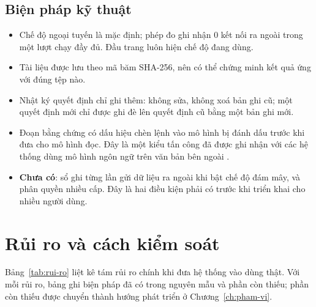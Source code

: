 \subsection*{Biện pháp kỹ thuật}

\begin{itemize}
\item Chế độ ngoại tuyến là mặc định; phép đo ghi nhận 0 kết nối ra ngoài trong một lượt chạy đầy đủ. Đầu trang luôn hiện chế độ đang dùng.
\item Tài liệu được lưu theo mã băm SHA-256, nên có thể chứng minh kết quả ứng với đúng tệp nào.
\item Nhật ký quyết định chỉ ghi thêm: không sửa, không xoá bản ghi cũ; một quyết định mới chỉ được ghi đè lên quyết định cũ bằng một bản ghi mới.
\item Đoạn bằng chứng có dấu hiệu chèn lệnh vào mô hình bị đánh dấu trước khi đưa cho mô hình đọc. Đây là một kiểu tấn công đã được ghi nhận với các hệ thống dùng mô hình ngôn ngữ trên văn bản bên ngoài \cite{greshake2023}.
\item \textbf{Chưa có}: sổ ghi từng lần gửi dữ liệu ra ngoài khi bật chế độ đám mây, và phân quyền nhiều cấp. Đây là hai điều kiện phải có trước khi triển khai cho nhiều người dùng.
\end{itemize}

\section{Rủi ro và cách kiểm soát}

Bảng~\ref{tab:rui-ro} liệt kê tám rủi ro chính khi đưa hệ thống vào dùng thật. Với mỗi rủi ro, bảng ghi biện pháp đã có trong nguyên mẫu và phần còn thiếu; phần còn thiếu được chuyển thành hướng phát triển ở Chương~\ref{ch:pham-vi}.

